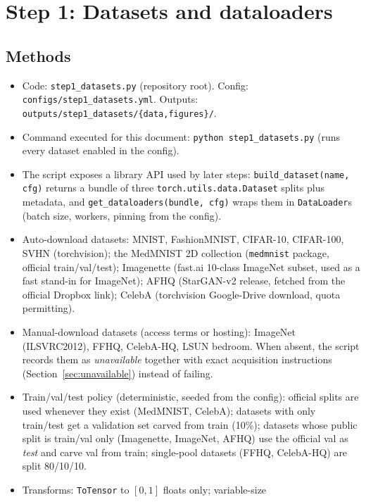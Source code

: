 \documentclass[11pt]{article}
\begin{document}
\section{Step 1: Datasets and dataloaders}

\subsection{Methods}
\begin{itemize}
  \item Code: \texttt{step1\_datasets.py} (repository root). Config:
        \texttt{configs/step1\_datasets.yml}. Outputs:
        \texttt{outputs/step1\_datasets/\{data,figures\}/}.
  \item Command executed for this document:
        \texttt{python step1\_datasets.py}
        (runs every dataset enabled in the config).
  \item The script exposes a library API used by later steps:
        \texttt{build\_dataset(name, cfg)} returns a bundle of three
        \texttt{torch.utils.data.Dataset} splits plus metadata, and
        \texttt{get\_dataloaders(bundle, cfg)} wraps them in
        \texttt{DataLoader}s (batch size, workers, pinning from the config).
  \item Auto-download datasets: MNIST, FashionMNIST, CIFAR-10, CIFAR-100,
        SVHN (torchvision); the MedMNIST 2D collection (\texttt{medmnist}
        package, official train/val/test); Imagenette (fast.ai 10-class
        ImageNet subset, used as a fast stand-in for ImageNet); AFHQ
        (StarGAN-v2 release, fetched from the official Dropbox link); CelebA
        (torchvision Google-Drive download, quota permitting).
  \item Manual-download datasets (access terms or hosting): ImageNet
        (ILSVRC2012), FFHQ, CelebA-HQ, LSUN bedroom. When absent, the script
        records them as \emph{unavailable} together with exact acquisition
        instructions (Section~\ref{sec:unavailable}) instead of failing.
  \item Train/val/test policy (deterministic, seeded from the config):
        official splits are used whenever they exist (MedMNIST, CelebA);
        datasets with only train/test get a validation set carved from train
        (10\%); datasets whose public split is train/val only (Imagenette,
        ImageNet, AFHQ) use the official val as \emph{test} and carve val
        from train; single-pool datasets (FFHQ, CelebA-HQ) are split
        80/10/10.
  \item Transforms: \texttt{ToTensor} to $[0,1]$ floats only; variable-size

\end{itemize}
\end{document}
